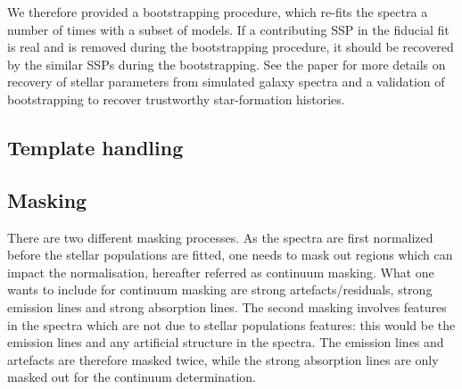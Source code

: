 \documentclass[usenatbib,usegraphicx,useAMS,onecolumn]{mn2e}
\begin{document}
We therefore provided a bootstrapping procedure, which re-fits the spectra a number of times with a subset of models.
If a contributing SSP in the fiducial fit is real and is removed during the bootstrapping procedure, it should be recovered by the similar SSPs during the bootstrapping.
See the paper for more details on recovery of stellar parameters from simulated galaxy spectra and a validation of bootstrapping to recover trustworthy star-formation histories.

\subsection{Template handling}
\label{subsec:ssp_template}
\subsection{Masking}
\label{subsec:ssp_mask}
There are two different masking processes.
As the spectra are first normalized before the stellar populations are fitted, one needs to mask out regions which can impact the normalisation, hereafter referred as continuum masking.
What one wants to include for continuum masking are strong artefacts/residuals, strong emission lines and strong absorption lines.
The second masking involves features in the spectra which are not due to stellar populations features: this would be the emission lines and any artificial structure in the spectra.
The emission lines and artefacts are therefore masked twice, while the strong absorption lines are only masked out for the continuum determination.
\end{document}
